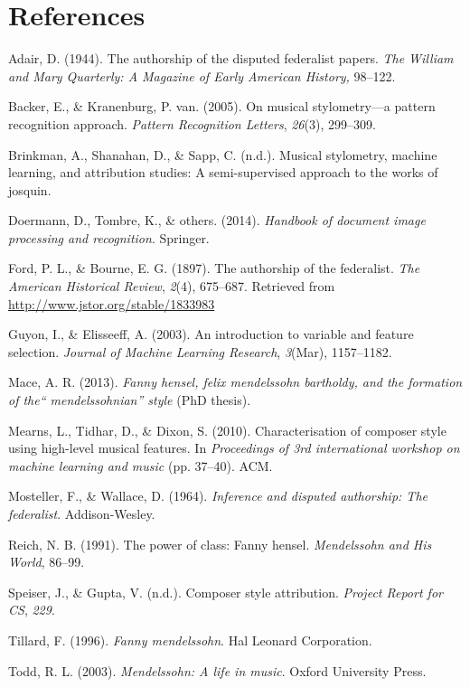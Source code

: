 \documentclass[12pt,twoside]{reedthesis}
\theoremstyle{definition}
\theoremstyle{definition}
\theoremstyle{definition}
\theoremstyle{remark}
\begin{document}
\backmatter

\chapter*{References}\label{references}


\noindent

\setlength{\parindent}{-0.20in} \setlength{\leftskip}{0.20in}
\setlength{\parskip}{8pt}

\hypertarget{refs}{}
\hypertarget{ref-adair1944}{}
Adair, D. (1944). The authorship of the disputed federalist papers.
\emph{The William and Mary Quarterly: A Magazine of Early American
History,} 98--122.

\hypertarget{ref-backer2005}{}
Backer, E., \& Kranenburg, P. van. (2005). On musical stylometry---a
pattern recognition approach. \emph{Pattern Recognition Letters},
\emph{26}(3), 299--309.

\hypertarget{ref-brinkman2016}{}
Brinkman, A., Shanahan, D., \& Sapp, C. (n.d.). Musical stylometry,
machine learning, and attribution studies: A semi-supervised approach to
the works of josquin.

\hypertarget{ref-OMR}{}
Doermann, D., Tombre, K., \& others. (2014). \emph{Handbook of document
image processing and recognition}. Springer.

\hypertarget{ref-authorshipfed}{}
Ford, P. L., \& Bourne, E. G. (1897). The authorship of the federalist.
\emph{The American Historical Review}, \emph{2}(4), 675--687. Retrieved
from \url{http://www.jstor.org/stable/1833983}

\hypertarget{ref-guyon2003}{}
Guyon, I., \& Elisseeff, A. (2003). An introduction to variable and
feature selection. \emph{Journal of Machine Learning Research},
\emph{3}(Mar), 1157--1182.

\hypertarget{ref-mace2013}{}
Mace, A. R. (2013). \emph{Fanny hensel, felix mendelssohn bartholdy, and
the formation of the`` mendelssohnian'' style} (PhD thesis).

\hypertarget{ref-mearns2010}{}
Mearns, L., Tidhar, D., \& Dixon, S. (2010). Characterisation of
composer style using high-level musical features. In \emph{Proceedings
of 3rd international workshop on machine learning and music} (pp.
37--40). ACM.

\hypertarget{ref-mosteller1964inference}{}
Mosteller, F., \& Wallace, D. (1964). \emph{Inference and disputed
authorship: The federalist}. Addison-Wesley.

\hypertarget{ref-reich1991}{}
Reich, N. B. (1991). The power of class: Fanny hensel. \emph{Mendelssohn
and His World}, 86--99.

\hypertarget{ref-CompStyleAttri}{}
Speiser, J., \& Gupta, V. (n.d.). Composer style attribution.
\emph{Project Report for CS}, \emph{229}.

\hypertarget{ref-tillard1996}{}
Tillard, F. (1996). \emph{Fanny mendelssohn}. Hal Leonard Corporation.

\hypertarget{ref-todd2003}{}
Todd, R. L. (2003). \emph{Mendelssohn: A life in music}. Oxford
University Press.


\end{document}
